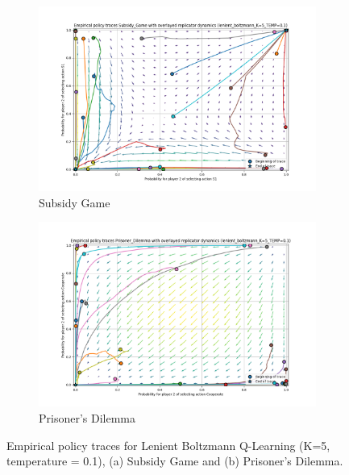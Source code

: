 \documentclass[12pt,a4paper, onecolumn]{exam}
\begin{document}
\begin{figure}[h]
    \centering
    \begin{subfigure}{0.49\textwidth}
        \centering
        \includegraphics[width=\linewidth]{plots/replicator_trajectoreis_Subsidy_Game_lenient_boltzmann_K=5_TEMP=0.1.png}
        \caption{Subsidy Game}
        \label{fig:lbsg}
    \end{subfigure}
    \hfill
    \begin{subfigure}{0.49\textwidth}
        \centering
        \includegraphics[width=\linewidth]{plots/replicator_trajectoreis_Prisoner_Dilemma_lenient_boltzmann_K=5_TEMP=0.1.png}
        \caption{Prisoner's Dilemma}
        \label{fig:lbpd}
    \end{subfigure}
    \caption{Empirical policy traces for Lenient Boltzmann Q-Learning (K=5, temperature = 0.1), (a) Subsidy Game and (b) Prisoner's Dilemma.}
    \label{fig:lenient_combined}
\end{figure}
\end{document}
